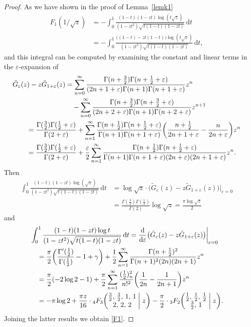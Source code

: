 \documentclass[12pt,reqno]{amsart}
\theoremstyle{remark}
\let\eps\varepsilon
\begin{document}
\begin{proof}
As we have shown in the proof of Lemma~\ref{lemk1}
\begin{align*}
F_1(1/\sqrt z)
&=-\int_0^1\frac{(1-t)(1-zt)\log(t\sqrt z)}{(1-zt^2)\sqrt{t(1-t)(1-zt)}}\,{{\mathrm d}} t
\\
&=-\int_0^1\frac{\bigl((1-t)-zt(1-t)\bigr)\log(t\sqrt z)}{(1-zt^2)\sqrt{t(1-t)(1-zt)}}\,{{\mathrm d}} t,
\end{align*}
and this integral can be computed by examining the constant and linear terms in
the $\eps$-expansion of
\begin{align*}
\tilde G_\eps(z)-z\tilde G_{1+\eps}(z)
&=\sum_{n=0}^\infty\frac{\Gamma(n+\frac32)\Gamma(n+\frac12+\eps)}{(2n+1+\eps)\Gamma(n+1)\Gamma(n+1+\eps)}z^n
\\ &\quad
-\sum_{n=0}^\infty\frac{\Gamma(n+\frac32)\Gamma(n+\frac32+\eps)}{(2n+2+\eps)\Gamma(n+1)\Gamma(n+2+\eps)}z^{n+1}
\\ &\kern-20mm
=\frac{\Gamma(\frac32)\Gamma(\frac12+\eps)}{\Gamma(2+\eps)}
+\sum_{n=1}^\infty\frac{\Gamma(n+\frac12)\Gamma(n+\frac12+\eps)}{\Gamma(n+1)\Gamma(n+1+\eps)}
\biggl(\frac{n+\frac12}{2n+1+\eps}-\frac{n}{2n+\eps}\biggr)z^n
\\ &\kern-20mm
=\frac{\Gamma(\frac32)\Gamma(\frac12+\eps)}{\Gamma(2+\eps)}
+\frac\eps2\sum_{n=1}^\infty\frac{\Gamma(n+\frac12)\Gamma(n+\frac12+\eps)}
{\Gamma(n+1)\Gamma(n+1+\eps)(2n+\eps)(2n+1+\eps)}z^n.
\end{align*}
Then
\begin{align*}
\int_0^1\frac{(1-t)(1-zt)\log(\sqrt z)}{(1-zt^2)\sqrt{t(1-t)(1-zt)}}\,{{\mathrm d}} t
&=\log\sqrt z\cdot\bigl(\tilde G_\eps(z)-z\tilde G_{1+\eps}(z)\bigr)\big|_{\eps=0}
\\
&=\frac{\Gamma(\frac32)\Gamma(\frac12)}{\Gamma(2)}\log\sqrt z
=\frac{\pi\log\sqrt z}2
\end{align*}
and
\begin{align*}
&
\int_0^1\frac{(1-t)(1-zt)\log t}{(1-zt^2)\sqrt{t(1-t)(1-zt)}}\,{{\mathrm d}} t
=\frac{{\mathrm d}}{{{\mathrm d}}\eps}\bigl(\tilde G_\eps(z)-z\tilde G_{1+\eps}(z)\bigr)\bigg|_{\eps=0}
\\ &\quad
=\frac\pi2\biggl(\frac{\Gamma'(\frac12)}{\Gamma(\frac12)}-1+\gamma\biggr)
+\frac12\sum_{n=1}^\infty\frac{\Gamma(n+\frac12)^2}
{\Gamma(n+1)^2(2n)(2n+1)}z^n
\\ &\quad
=\frac\pi2(-2\log2-1)
+\frac\pi2\sum_{n=1}^\infty\frac{(\frac12)_n^2}
{n!^2}\biggl(\frac1{2n}-\frac1{2n+1}\biggr)z^n
\\ &\quad
=-\pi\log2
+\frac{\pi z}{16}\cdot{}_4F_3\biggl(\begin{matrix} \frac32, \, \frac32, \, 1, \, 1 \\
2, \, 2, \, 2 \end{matrix}\biggm| z\biggr)
-\frac\pi2\cdot{}_3F_2\biggl(\begin{matrix} \frac12, \, \frac12, \, \frac12 \\
\frac32, \, 1 \end{matrix}\biggm| z\biggr).
\end{align*}
Joining the latter results we obtain \eqref{F1}.
\end{proof}
\end{document}

